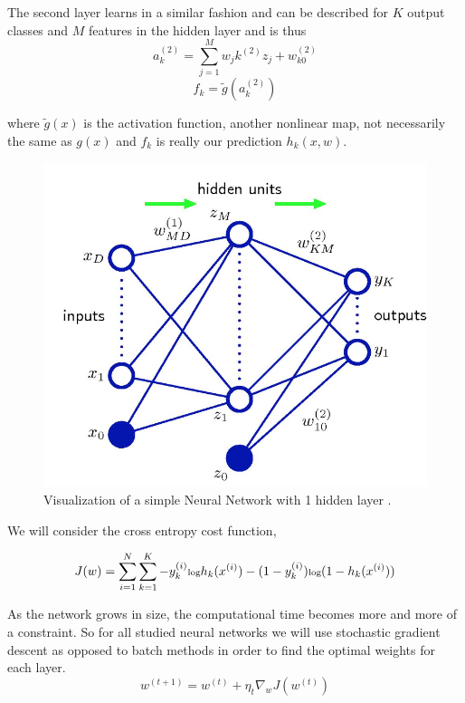 \documentclass[12pt, twocolumn]{article}
\begin{document}
The second layer learns in a similar fashion and can be described for $K$ output classes and $M$ features in the hidden layer and is thus 
\begin{equation}
a_k^{(2)}= \sum_{j=1}^M w_jk^{(2)} z_j+w_{k0}^{(2)}
\end{equation}
\begin{equation}
f_k= \tilde{g}(a_k^{(2)})
\end{equation}
 
where $\tilde{g}(x)$ is the activation function, another nonlinear map, not necessarily the same as $g(x)$ and $f_k$ is really our prediction $h_k(x,w)$. 

\begin{figure}
\includegraphics[scale=.6]{simpleNN.png}

\caption{Visualization of a simple Neural Network with 1 hidden layer \cite{Bishop} . }
\label{fig:basicNN}
\end{figure}


We will consider the cross entropy cost function, 

\begin{equation}
\scriptsize
J(w)= \sum_{i=1}^N \sum_{k=1}^K -y^{(i)}_k \textrm{log}h_k(x^{(i)})- (1 -y^{(i)}_k) \textrm{log}(1 -h_k(x^{(i)}))
\end {equation}



As the network grows in size, the computational time becomes more and more of a constraint. So for all studied neural networks we will use stochastic gradient descent as opposed to batch methods in order to find the optimal weights for each layer. 
\begin{equation}
w^{(t+1)} = w^{(t)} + \eta_t \nabla_w J(w^{(t)})
\end{equation}
\end{document}

